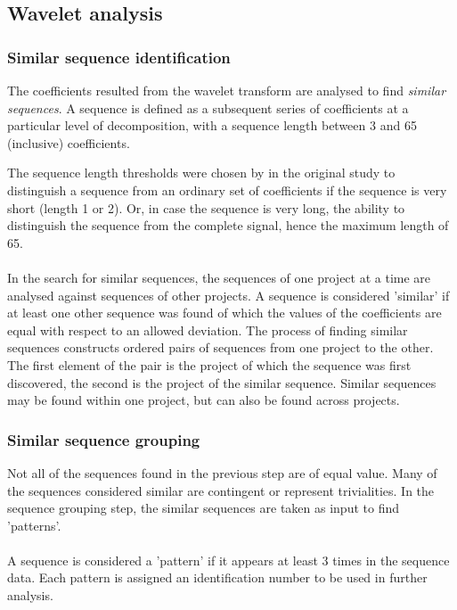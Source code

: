 \subsection{Wavelet analysis}
\subsubsection{Similar sequence identification}
The coefficients resulted from the wavelet transform are analysed to find
\emph{similar sequences}\rm. A sequence is defined as a subsequent series of
coefficients at a particular level of decomposition, with a sequence length
between 3 and 65 (inclusive) coefficients.

The sequence length thresholds were chosen by \citet{karus2013} in the original
study to distinguish a sequence from an ordinary set of coefficients if the
sequence is very short (length 1 or 2). Or, in case the sequence is very long,
the ability to distinguish the sequence from the complete signal, hence the
maximum length of 65.

\paragraph{}
In the search for similar sequences, the sequences of one project at a time are
analysed against sequences of other projects. A sequence is considered
'similar' if at least one other sequence was found of which the values of the
coefficients are equal with respect to an allowed deviation. The process of
finding similar sequences constructs ordered pairs of sequences from one
project to the other. The first element of the pair is the project of which the
sequence was first discovered, the second is the project of the similar
sequence. Similar sequences may be found within one project, but can also be
found across projects.

\subsubsection{Similar sequence grouping}
\label{def:pattern}
Not all of the sequences found in the previous step are of equal value. Many of
the sequences considered similar are contingent or represent trivialities. In
the sequence grouping step, the similar sequences are taken as input to find
'patterns'.

\paragraph{}
A sequence is considered a 'pattern' if it appears at least 3 times in the
sequence data. Each pattern is assigned an identification number to be used in
further analysis.

